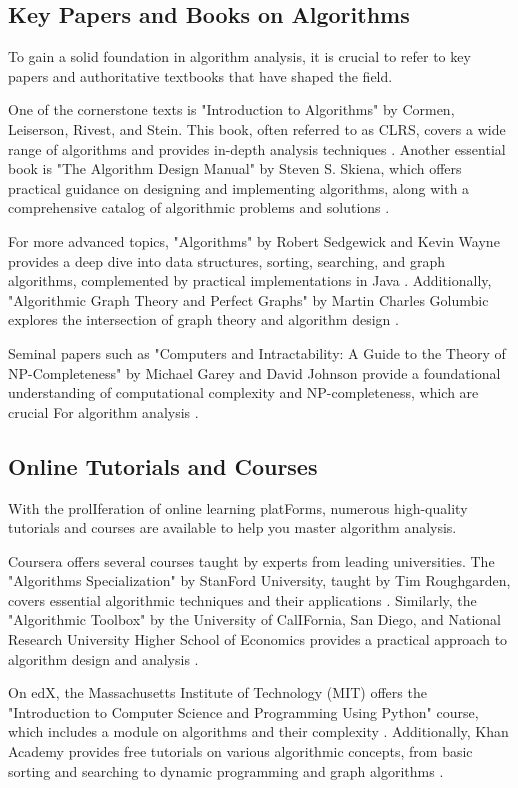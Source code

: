 \documentclass[12pt]{book} %
\begin{document}
\subsection{Key Papers and Books on Algorithms}
To gain a solid foundation in algorithm analysis, it is crucial to refer to key papers and authoritative textbooks that have shaped the field. 

One of the cornerstone texts is "Introduction to Algorithms" by Cormen, Leiserson, Rivest, and Stein. This book, often referred to as CLRS, covers a wide range of algorithms and provides in-depth analysis techniques . Another essential book is "The Algorithm Design Manual" by Steven S. Skiena, which offers practical guidance on designing and implementing algorithms, along with a comprehensive catalog of algorithmic problems and solutions .

For more advanced topics, "Algorithms" by Robert Sedgewick and Kevin Wayne provides a deep dive into data structures, sorting, searching, and graph algorithms, complemented by practical implementations in Java . Additionally, "Algorithmic Graph Theory and Perfect Graphs" by Martin Charles Golumbic explores the intersection of graph theory and algorithm design .

Seminal papers such as "Computers and Intractability: A Guide to the Theory of NP-Completeness" by Michael Garey and David Johnson provide a foundational understanding of computational complexity and NP-completeness, which are crucial For algorithm analysis .

\subsection{Online Tutorials and Courses}
With the prolIferation of online learning platForms, numerous high-quality tutorials and courses are available to help you master algorithm analysis. 

Coursera offers several courses taught by experts from leading universities. The "Algorithms Specialization" by StanFord University, taught by Tim Roughgarden, covers essential algorithmic techniques and their applications . Similarly, the "Algorithmic Toolbox" by the University of CalIFornia, San Diego, and National Research University Higher School of Economics provides a practical approach to algorithm design and analysis .

On edX, the Massachusetts Institute of Technology (MIT) offers the "Introduction to Computer Science and Programming Using Python" course, which includes a module on algorithms and their complexity . Additionally, Khan Academy provides free tutorials on various algorithmic concepts, from basic sorting and searching to dynamic programming and graph algorithms .
\end{document}
